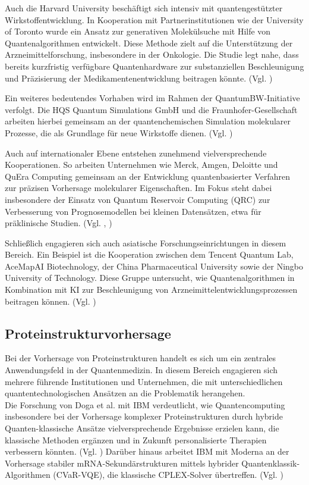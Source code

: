 Auch die Harvard University beschäftigt sich intensiv mit quantengestützter Wirkstoffentwicklung. In Kooperation mit Partnerinstitutionen wie der University of Toronto wurde ein Ansatz zur generativen Molekülsuche mit Hilfe von Quantenalgorithmen entwickelt. Diese Methode zielt auf die Unterstützung der Arzneimittelforschung, insbesondere in der Onkologie. Die Studie legt nahe, dass bereits kurzfristig verfügbare Quantenhardware zur substanziellen Beschleunigung und Präzisierung der Medikamentenentwicklung beitragen könnte. (Vgl. \cite{vakiliQuantumComputingEnhancedAlgorithm2024})

Ein weiteres bedeutendes Vorhaben wird im Rahmen der QuantumBW-Initiative verfolgt. Die HQS Quantum Simulations GmbH und die Fraunhofer-Gesellschaft arbeiten hierbei gemeinsam an der quantenchemischen Simulation molekularer Prozesse, die als Grundlage für neue Wirkstoffe dienen. (Vgl. \cite{fraunhofer_iais_quantum_2023})

Auch auf internationaler Ebene entstehen zunehmend vielversprechende Kooperationen. So arbeiten Unternehmen wie Merck, Amgen, Deloitte und QuEra Computing gemeinsam an der Entwicklung quantenbasierter Verfahren zur präzisen Vorhersage molekularer Eigenschaften. Im Fokus steht dabei insbesondere der Einsatz von Quantum Reservoir Computing (QRC) zur Verbesserung von Prognosemodellen bei kleinen Datensätzen, etwa für präklinische Studien. (Vgl. \cite{beaulieu_robust_2024}, \cite{kornjaca_large-scale_2024})

Schließlich engagieren sich auch asiatische Forschungseinrichtungen in diesem Bereich. Ein Beispiel ist die Kooperation zwischen dem Tencent Quantum Lab, AceMapAI Biotechnology, der China Pharmaceutical University sowie der Ningbo University of Technology. Diese Gruppe untersucht, wie Quantenalgorithmen in Kombination mit KI zur Beschleunigung von Arzneimittelentwicklungsprozessen beitragen können. (Vgl. \cite{li_hybrid_2024})


\subsection*{Proteinstrukturvorhersage}

Bei der Vorhersage von Proteinstrukturen handelt es sich um ein zentrales Anwendungsfeld in der Quantenmedizin. In diesem Bereich engagieren sich mehrere führende Institutionen und Unternehmen, die mit unterschiedlichen quantentechnologischen Ansätzen an die Problematik herangehen.\\
Die Forschung von Doga et al. mit IBM verdeutlicht, wie Quantencomputing insbesondere bei der Vorhersage komplexer Proteinstrukturen durch hybride Quanten-klassische Ansätze vielversprechende Ergebnisse erzielen kann, die klassische Methoden ergänzen und in Zukunft personalisierte Therapien verbessern könnten. (Vgl. \cite{doga_perspective_2024})
Darüber hinaus arbeitet IBM mit Moderna an der Vorhersage stabiler mRNA-Sekundärstrukturen mittels hybrider Quantenklassik-Algorithmen (CVaR-VQE), die klassische CPLEX-Solver übertreffen. (Vgl. \cite{hou_lipid_2021})

